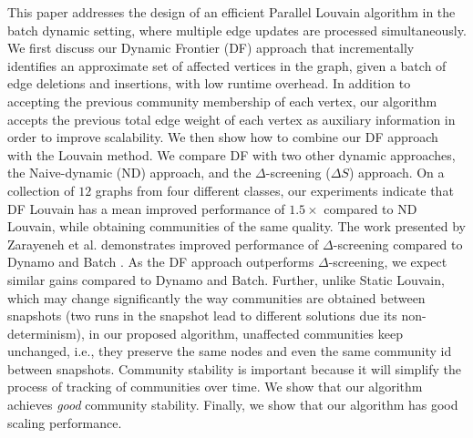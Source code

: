 This paper addresses the design of an efficient Parallel Louvain algorithm in the batch dynamic setting, where multiple edge updates are processed simultaneously. We first discuss our Dynamic Frontier (DF) approach that incrementally identifies an approximate set of affected vertices in the graph, given a batch of edge deletions and insertions, with low runtime overhead. In addition to accepting the previous community membership of each vertex, our algorithm accepts the previous total edge weight of each vertex as auxiliary information in order to improve scalability. We then show how to combine our DF approach with the Louvain method. We compare DF with two other dynamic approaches, the Naive-dynamic (ND) approach, and the $\Delta$-screening ($\Delta S$) approach. On a collection of $12$ graphs from four different classes, our experiments indicate that DF Louvain has a mean improved performance of $1.5\times$ compared to ND Louvain, while obtaining communities of the same quality. The work presented by Zarayeneh et al. \cite{com-zarayeneh21} demonstrates improved performance of $\Delta$-screening compared to Dynamo \cite{com-zhuang19} and Batch \cite{com-chong13}. As the DF approach outperforms $\Delta$-screening, we expect similar gains compared to Dynamo and Batch. Further, unlike Static Louvain, which may change significantly the way communities are obtained between snapshots (two runs in the snapshot lead to different solutions due its non-determinism), in our proposed algorithm, unaffected communities keep unchanged, i.e., they preserve the same nodes and even the same community id between snapshots. Community stability is important because it will simplify the process of tracking of communities over time. We show that our algorithm achieves \textit{good} community stability. Finally, we show that our algorithm has good scaling performance.






